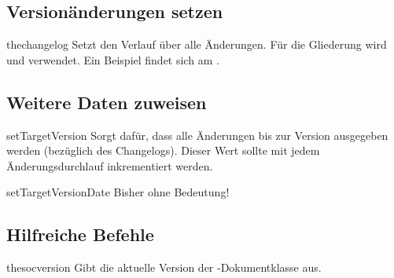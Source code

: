 \documentclass{sopra-base}
\begin{document}
\subsection{Versionänderungen setzen}

\begin{command}{thechangelog}{}
    Setzt den Verlauf über alle Änderungen. Für die Gliederung wird  und  verwendet. Ein Beispiel findet sich am .
\end{command}

\subsection{Weitere Daten zuweisen}

\begin{command}{setTargetVersion}{}
    Sorgt dafür, dass alle Änderungen bis zur Version  ausgegeben werden (bezüglich des Changelogs). Dieser Wert sollte mit jedem Änderungsdurchlauf inkrementiert werden. 
\end{command}

\begin{command}{setTargetVersionDate}{}
    Bisher ohne Bedeutung!
\end{command}


\subsection{Hilfreiche Befehle}

\begin{command}{thesocversion}{}
    Gibt die aktuelle Version der -Dokumentklasse aus. 
\end{command}

\label{mrk:docend}
\thechangelog
\end{document}
